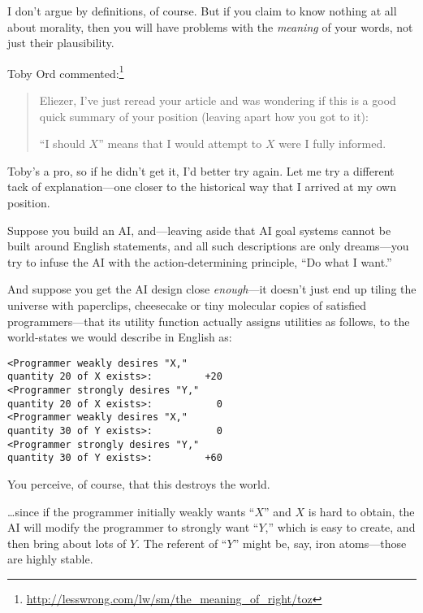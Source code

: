  I don't argue by definitions, of course. But if
you claim to know nothing at all about morality, then you will have
problems with the \textit{meaning} of your words, not just their
plausibility.

\myendsectiontext


\bigskip



 Toby Ord commented:\footnote{\url{http://lesswrong.com/lw/sm/the_meaning_of_right/toz}}

\begin{quotation}

 Eliezer, I've just reread your article and was
wondering if this is a good quick summary of your position (leaving
apart how you got to it):

{
 ``I should $X$'' means that I
  would attempt to $X$ were I fully informed.}
\end{quotation}


 Toby's a pro, so if he didn't get
it, I'd better try again. Let me try a different tack
of explanation---one closer to the historical way that I arrived at my
own position.


 Suppose you build an AI, and---leaving aside that AI goal systems
cannot be built around English statements, and all such descriptions
are only dreams---you try to infuse the AI with the action-determining
principle, ``Do what I want.''


 And suppose you get the AI design close \textit{enough}{}---it
doesn't just end up tiling the universe with
paperclips, cheesecake or tiny molecular copies of satisfied
programmers---that its utility function actually assigns utilities as
follows, to the world-states we would describe in English as:

\begin{verbatim}
<Programmer weakly desires "X,"
quantity 20 of X exists>:         +20
<Programmer strongly desires "Y,"
quantity 20 of X exists>:           0
<Programmer weakly desires "X,"
quantity 30 of Y exists>:           0
<Programmer strongly desires "Y,"
quantity 30 of Y exists>:         +60
\end{verbatim}



 You perceive, of course, that this destroys the world.


 \ldots since if the programmer initially weakly wants
``$X$'' and $X$ is hard to obtain, the
AI will modify the programmer to strongly want
``$Y$,'' which is easy to create, and
then bring about lots of $Y$. The referent of ``$Y$''
might be, say, iron atoms---those are highly
stable.


